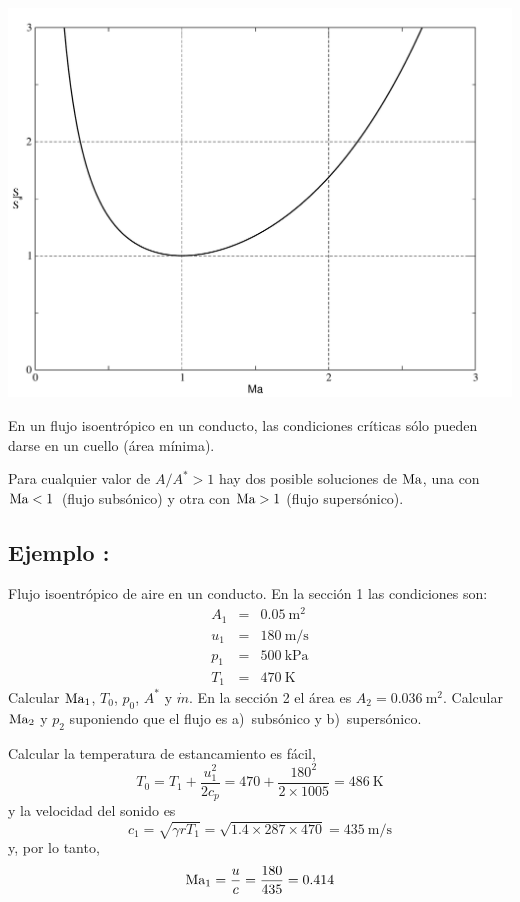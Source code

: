 	

	
	\includegraphics[clip,width=1\linewidth]{TeX_files/chapter11-Compresible/seccion} 
	
	En un flujo isoentrópico en un conducto, las condiciones críticas
	sólo pueden darse en un cuello (área mínima).
	
	Para cualquier valor de $A/A^{*}>1$ hay dos posible soluciones de
	$\text{Ma}$, una con $\text{Ma}<1$~(flujo subsónico) y otra con $\text{Ma}>1$ (flujo
	supersónico).
	\subsection*{Ejemplo :}
		Flujo isoentrópico de aire en un conducto. En la sección 1 las condiciones
		son: 
		\begin{eqnarray*}
			A_{1} & = & 0.05~\text{m}^{2}\\
			u_{1} & = & 180~\text{m/s}\\
			p_{1} & = & 500~\text{kPa}\\
			T_{1} & = & 470~\text{K}
		\end{eqnarray*}
		Calcular $\text{Ma}_{1}$, $T_{0}$, $p_{0}$, $A^{*}$ y $\dot{m}$. En
		la sección 2 el área es $A_{2}=0.036~\text{m}^{2}$. Calcular $\text{Ma}_{2}$
		y $p_{2}$ suponiendo que el flujo es a)~subsónico y b)~supersónico.

		Calcular la temperatura de estancamiento es fácil, 
		\[
		T_{0}=T_{1}+\frac{u_{1}^{2}}{2c_{p}}=470+\frac{180^{2}}{2\times1005}=486~\text{K}
		\]
		y la velocidad del sonido es 
		\[
		c_{1}=\sqrt{\gamma rT_{1}}=\sqrt{1.4\times287\times470}=435~\text{m/s}
		\]
		y, por lo tanto, 
		\[
		\text{Ma}_{1}=\frac{u}{c}=\frac{180}{435}=0.414
		\]
		
